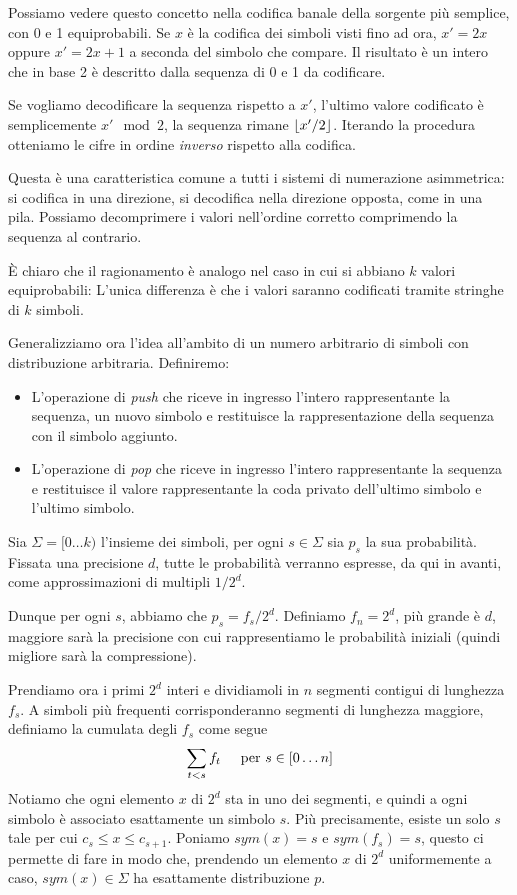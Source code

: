 Possiamo vedere questo concetto nella codifica banale della sorgente più semplice, con 0 e 1 equiprobabili. Se $x$ è la codifica dei simboli visti fino ad ora, $x' = 2x$ oppure $x' = 2x + 1$ a seconda del simbolo che compare. Il risultato è un intero che in base 2 è descritto dalla sequenza di 0 e 1 da codificare.

Se vogliamo decodificare la sequenza rispetto a $x'$, l'ultimo valore codificato è semplicemente $x' \mod 2$, la sequenza rimane $\left\lfloor x'/2 \right\rfloor$. Iterando la procedura otteniamo le cifre in ordine \textit{inverso} rispetto alla codifica.

Questa è una caratteristica comune a tutti i sistemi di numerazione asimmetrica: si codifica in una direzione, si decodifica nella direzione opposta, come in una pila. Possiamo decomprimere i valori nell'ordine corretto comprimendo la sequenza al contrario.

È chiaro che il ragionamento è analogo nel caso in cui si abbiano $k$ valori equiprobabili: L'unica differenza è che i valori saranno codificati tramite stringhe di $k$ simboli.

Generalizziamo ora l'idea all'ambito di un numero arbitrario di simboli con distribuzione arbitraria. Definiremo:
\begin{itemize}
    \item L'operazione di \textit{push} che riceve in ingresso l'intero rappresentante la sequenza, un nuovo simbolo e restituisce la rappresentazione della sequenza con il simbolo aggiunto.
    \item L'operazione di \textit{pop} che riceve in ingresso l'intero rappresentante la sequenza e restituisce il valore rappresentante la coda privato dell'ultimo simbolo e l'ultimo simbolo. 
\end{itemize}
Sia $\Sigma = [0 \dots k)$ l'insieme dei simboli, per ogni $s \in \Sigma$ sia $p_s$ la sua probabilità. Fissata una precisione $d$, tutte le probabilità verranno espresse, da qui in avanti, come approssimazioni di multipli $1/2^d$.

Dunque per ogni $s$, abbiamo che $p_s = f_s / 2^d$. Definiamo $f_n = 2^d$, più grande è $d$, maggiore sarà la precisione con cui rappresentiamo le probabilità iniziali (quindi migliore sarà la compressione).

Prendiamo ora i primi $2^d$ interi e dividiamoli in $n$ segmenti contigui di lunghezza $f_s$. A simboli più frequenti corrisponderanno segmenti di lunghezza maggiore, definiamo la cumulata degli $f_s$ come segue
\begin{equation*}
    \sum_{t < s}f_t \hspace{5mm} \textnormal{per $s$} \in [0 \dots n]
\end{equation*}
Notiamo che ogni elemento $x$ di $2^d$ sta in uno dei segmenti, e quindi a ogni simbolo è associato esattamente un simbolo $s$. Più precisamente, esiste un solo $s$ tale per cui $c_s \leq x \leq c_{s + 1}$. Poniamo $sym(x) = s$ e $sym(f_s) = s$, questo ci permette di fare in modo che, prendendo un elemento $x$ di $2^d$ uniformemente a caso, $sym(x) \in \Sigma$ ha esattamente distribuzione $p$.

